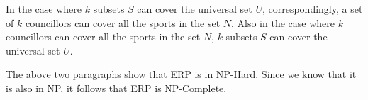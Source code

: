 \documentclass[paper=a4, fontsize=11pt]{scrartcl} %
\numberwithin{equation}{section} %
\numberwithin{figure}{section} %
\numberwithin{table}{section} %
\begin{document}
\begin{enumerate}
In the case where $k$ subsets $S$ can cover the universal set $U$, correspondingly, a set of $k$ councillors can cover all the sports in the set $N$. Also in the case where $k$ councillors can cover all the sports in the set $N$, $k$ subsets $S$ can cover the universal set $U$. 

The above two paragraphs show that ERP is in NP-Hard. Since we know that it is also in NP, it follows that ERP is NP-Complete.

\end{enumerate}

\end{document}
